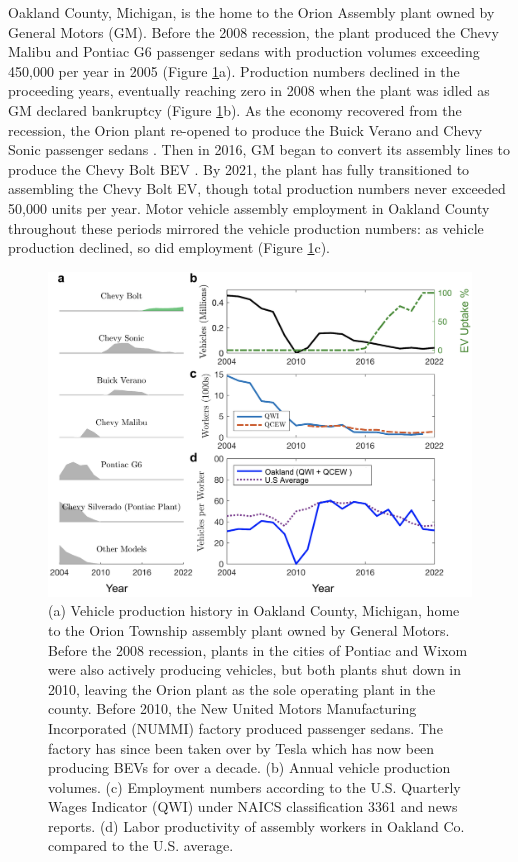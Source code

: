 \documentclass[sn-mathphys,Numbered]{sn-jnl}%
\begin{document}
Oakland County, Michigan, is the home to the Orion Assembly plant owned by General Motors (GM). Before the 2008 recession, the plant produced the Chevy Malibu and Pontiac G6 passenger sedans with production volumes exceeding 450,000 per year in 2005 (Figure \ref{fig:oakland}a). Production numbers declined in the proceeding years, eventually reaching zero in 2008 when the plant was idled as GM declared bankruptcy \cite{Goldstein2017-cm} (Figure \ref{fig:oakland}b). As the economy recovered from the recession, the Orion plant re-opened to produce the Buick Verano and Chevy Sonic passenger sedans \cite{Vlasic2011-hc, Nadrowski2011-xq}. Then in 2016, GM began to convert its assembly lines to produce the Chevy Bolt BEV \cite{Burden2016-pg}. By 2021, the plant has fully transitioned to assembling the Chevy Bolt EV, though total production numbers never exceeded 50,000 units per year. Motor vehicle assembly employment in Oakland County throughout these periods mirrored the vehicle production numbers: as vehicle production declined, so did employment (Figure \ref{fig:oakland}c).


\begin{figure}[tp!]
\centering
\includegraphics[width=1.0\linewidth]{figures/fig_oakland.png}
\caption{(a) Vehicle production history in Oakland County, Michigan, home to the Orion Township assembly plant owned by General Motors. Before the 2008 recession, plants in the cities of Pontiac and Wixom were also actively producing vehicles, but both plants shut down in 2010, leaving the Orion plant as the sole operating plant in the county. Before 2010, the New United Motors Manufacturing Incorporated (NUMMI) factory produced passenger sedans. The factory has since been taken over by Tesla which has now been producing BEVs for over a decade. (b) Annual vehicle production volumes. (c) Employment numbers according to the U.S. Quarterly Wages Indicator (QWI) under NAICS classification 3361 and news reports. (d) Labor productivity of assembly workers in Oakland Co. compared to the U.S. average.}
\label{fig:oakland}
\end{figure}
\end{document}
